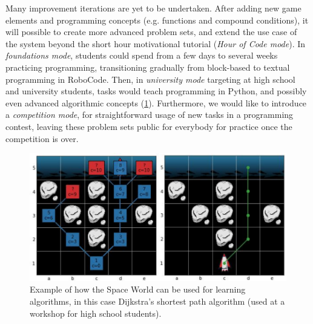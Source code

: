 Many improvement iterations are yet to be undertaken. After adding
new game elements and programming concepts (e.g. functions and compound
conditions), it will possible to create more advanced problem sets,
and extend the use
case of the system beyond the short hour motivational tutorial (\emph{Hour of Code mode}).  %
In \emph{foundations mode}, students could spend from a few days to several weeks practicing
programming, transitioning gradually from block-based to textual programming
in RoboCode.
Then, in \emph{university mode} targeting at high school and university students,
tasks would teach programming in Python, and possibly even advanced algorithmic
concepts (\cref{fig:robomission-search-tree}).
Furthermore, we would like to introduce a \emph{competition mode}, for
straightforward usage of new tasks in a programming contest,
leaving these problem sets public for everybody for practice once the
competition is over.

\begin{figure}[htb]
\centering
\includegraphics[width=\textwidth]{img/robomission-search-tree}
\caption{%
  Example of how the Space World can be used for learning algorithms,
  in this case Dijkstra's shortest path algorithm
  (used at a workshop for high school students).}
\label{fig:robomission-search-tree}
\end{figure}

